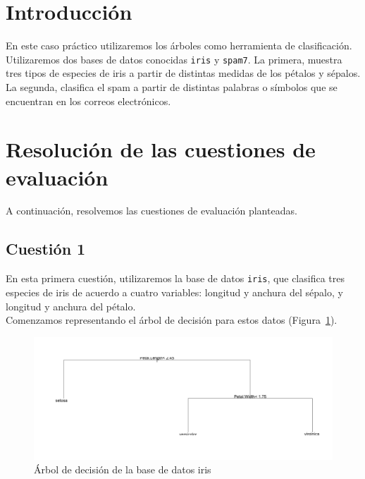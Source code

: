 \documentclass[12pt,a4paper,twoside,openright,titlepage,final]{article}
\author{José Ignacio Escribano}
\title{}
\begin{document}
\setcounter{page}{1}


\listoffigures
\thispagestyle{empty}
\newpage

\listoftables
\thispagestyle{empty}
\newpage

\tableofcontents
\thispagestyle{empty}
\newpage


\setcounter{page}{1}

\section{Introducción}

En este caso práctico utilizaremos los árboles como herramienta de clasificación. Utilizaremos dos bases de datos conocidas \texttt{iris} y \texttt{spam7}. La primera, muestra tres tipos de especies de iris a partir de distintas medidas de los pétalos y sépalos. La segunda, clasifica el spam a partir de distintas palabras o símbolos que se encuentran en los correos electrónicos.

\section{Resolución de las cuestiones de evaluación}

A continuación, resolvemos las cuestiones de evaluación planteadas.

\subsection{Cuestión 1}

En esta primera cuestión, utilizaremos la base de datos \texttt{iris}, que clasifica tres especies de iris de acuerdo a cuatro variables: longitud y anchura del sépalo, y longitud y anchura del pétalo.\\

Comenzamos representando el árbol de decisión para estos datos (Figura~\ref{fig:iris_sin_podar}).\\

\begin{figure}[tbph!]
\centering
\includegraphics[width=0.9\linewidth]{imagenes/iris_sin_podar}
\caption{Árbol de decisión de la base de datos iris}
\label{fig:iris_sin_podar}
\end{figure}
\end{document}
